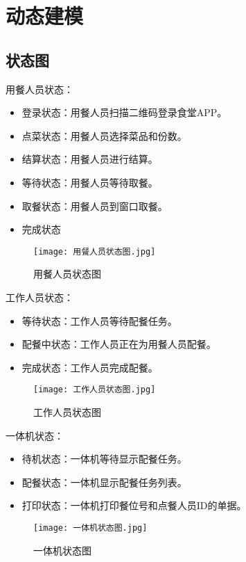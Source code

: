 \documentclass[../main.tex]{subfiles}
\begin{document}
\section{动态建模}
\subsection{状态图}
%
用餐人员状态：
\begin{itemize}
  \item {登录状态}：用餐人员扫描二维码登录食堂APP。
  \item {点菜状态}：用餐人员选择菜品和份数。
  \item {结算状态}：用餐人员进行结算。
  \item {等待状态}：用餐人员等待取餐。
  \item {取餐状态}：用餐人员到窗口取餐。
  \item {完成状态}
\end{itemize}

\begin{figure}[H]
  \begin{center}
    \texttt{[image: 用餐人员状态图.jpg]}
  \end{center}
  \caption{用餐人员状态图}
\end{figure}

工作人员状态：
\begin{itemize}
  \item 等待状态：工作人员等待配餐任务。
  \item 配餐中状态：工作人员正在为用餐人员配餐。
  \item 完成状态：工作人员完成配餐。
\end{itemize}

\begin{figure}[H]
  \begin{center}
    \texttt{[image: 工作人员状态图.jpg]}
  \end{center}
  \caption{工作人员状态图}
\end{figure}

一体机状态：
\begin{itemize}
  \item 待机状态：一体机等待显示配餐任务。
  \item 配餐状态：一体机显示配餐任务列表。
  \item 打印状态：一体机打印餐位号和点餐人员ID的单据。
\end{itemize}

\begin{figure}[H]
  \begin{center}
    \texttt{[image: 一体机状态图.jpg]}
  \end{center}
  \caption{一体机状态图}
\end{figure}
\end{document}
